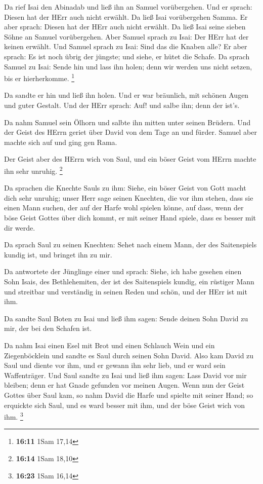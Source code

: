  Da rief Isai den Abinadab und ließ ihn an Samuel
vorübergehen. Und er sprach: Diesen hat der HErr auch nicht erwählt.
 Da ließ Isai vorübergehen Samma. Er aber sprach: Diesen hat
der HErr auch nicht erwählt.  Da ließ Isai seine sieben
Söhne an Samuel vorübergehen. Aber Samuel sprach zu Isai: Der HErr hat
der keinen erwählt.  Und Samuel sprach zu Isai: Sind das
die Knaben alle? Er aber sprach: Es ist noch übrig der jüngste; und
siehe, er hütet die Schafe. Da sprach Samuel zu Isai: Sende hin und lass
ihn holen; denn wir werden uns nicht setzen, bis er hierherkomme.
\footnote{\textbf{16:11} 1Sam 17,14}

 Da sandte er hin und ließ ihn holen. Und er war bräunlich,
mit schönen Augen und guter Gestalt. Und der HErr sprach: Auf! und salbe
ihn; denn der ist's.

 Da nahm Samuel sein Ölhorn und salbte ihn mitten unter
seinen Brüdern. Und der Geist des HErrn geriet über David von dem Tage
an und fürder. Samuel aber machte sich auf und ging gen Rama.

 Der Geist aber des HErrn wich von Saul, und ein böser
Geist vom HErrn machte ihn sehr unruhig. \footnote{\textbf{16:14} 1Sam
  18,10}

 Da sprachen die Knechte Sauls zu ihm: Siehe, ein böser
Geist von Gott macht dich sehr unruhig;  unser Herr sage
seinen Knechten, die vor ihm stehen, dass sie einen Mann suchen, der auf
der Harfe wohl spielen könne, auf dass, wenn der böse Geist Gottes über
dich kommt, er mit seiner Hand spiele, dass es besser mit dir werde.

 Da sprach Saul zu seinen Knechten: Sehet nach einem Mann,
der des Saitenspiels kundig ist, und bringet ihn zu mir.

 Da antwortete der Jünglinge einer und sprach: Siehe, ich
habe gesehen einen Sohn Isais, des Bethlehemiten, der ist des
Saitenspiels kundig, ein rüstiger Mann und streitbar und verständig in
seinen Reden und schön, und der HErr ist mit ihm.

 Da sandte Saul Boten zu Isai und ließ ihm sagen: Sende
deinen Sohn David zu mir, der bei den Schafen ist.

 Da nahm Isai einen Esel mit Brot und einen Schlauch Wein
und ein Ziegenböcklein und sandte es Saul durch seinen Sohn David.
 Also kam David zu Saul und diente vor ihm, und er gewann
ihn sehr lieb, und er ward sein Waffenträger.  Und Saul
sandte zu Isai und ließ ihm sagen: Lass David vor mir bleiben; denn er
hat Gnade gefunden vor meinen Augen.  Wenn nun der Geist
Gottes über Saul kam, so nahm David die Harfe und spielte mit seiner
Hand; so erquickte sich Saul, und es ward besser mit ihm, und der böse
Geist wich von ihm. \footnote{\textbf{16:23} 1Sam 16,14}

